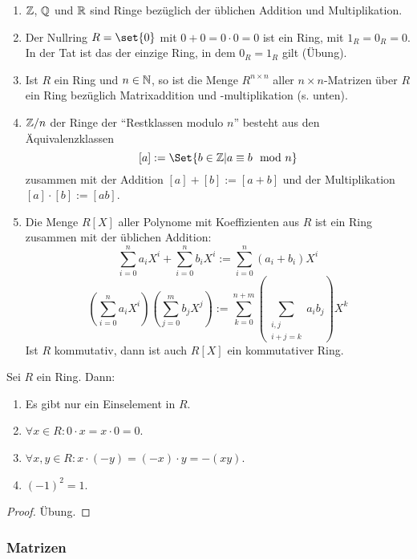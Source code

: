 \begin{example}
    \begin{enumerate}
        \item $\mathbb{Z}$, $\mathbb{Q}$ und $\mathbb{R}$ sind Ringe bezüglich der üblichen Addition und
        Multiplikation.
        \item Der Nullring $R=\set{0}$ mit $0+0=0\cdot0=0$ ist ein Ring, mit $1_R=0_R=0$. In der Tat ist das der einzige Ring, in dem $0_R=1_R$ gilt (Übung).
        \item Ist $R$ ein Ring und $n\in\mathbb{N}$, so ist die Menge $R^{n\times n}$ aller $n\times n$-Matrizen über $R$ ein Ring bezüglich Matrixaddition und -multiplikation (s. unten).
        \item $\mathbb{Z}/n$ der Ringe der \enquote{Restklassen modulo $n$} besteht aus den Äquivalenzklassen
        \[[a] := \Set{b\in\IZ | a\equiv b \mod n}\]
        zusammen mit der Addition $[a]+[b]:=[a+b]$ und der Multiplikation $[a]\cdot[b]:=[ab]$.
        \item Die Menge $R[X]$ aller Polynome mit Koeffizienten aus $R$ ist ein
        Ring zusammen mit der üblichen Addition:
        \[\sum_{i=0}^n a_i X^i + \sum_{i=0}^n b_i X^i := \sum_{i=0}^{n} (a_i+b_i)X^i\]
        \[(\sum_{i=0}^n a_i X^i)(\sum_{j=0}^m b_j X^j) := \sum_{k=0}^{n+m} (\sum_{\substack{i,j \\ i+j=k}} a_i b_j) X^k\]
        Ist $R$ kommutativ, dann ist auch $R[X]$ ein kommutativer Ring.
    \end{enumerate}
\end{example}

\begin{lemma}
    Sei $R$ ein Ring. Dann:
    \begin{enumerate}
        \item Es gibt nur ein Einselement in $R$.
        \item $\forall x \in R : 0\cdot x = x \cdot 0 = 0$.
        \item $\forall x,y \in R : x\cdot(-y)=(-x)\cdot y = -(xy)$.
        \item $(-1)^2 = 1$.
    \end{enumerate}
\end{lemma}
\begin{proof}
    Übung.
\end{proof}

\subsubsection{Matrizen}

